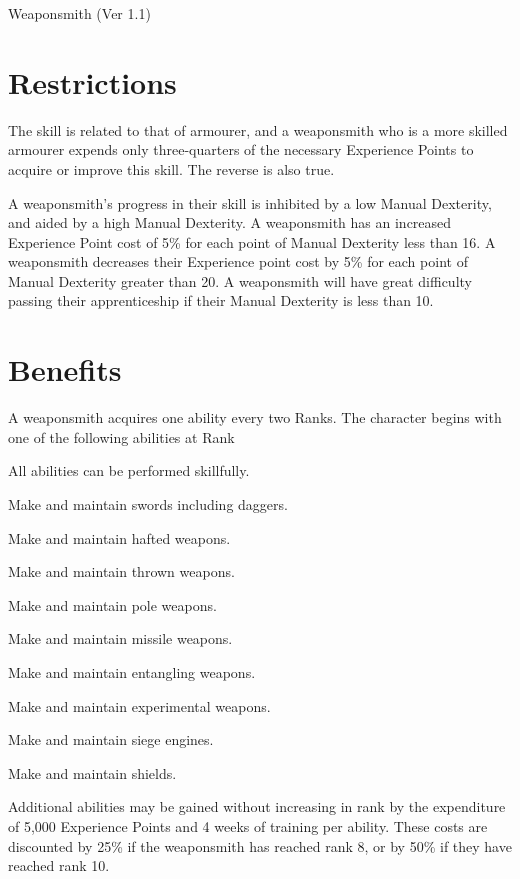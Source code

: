 \begin{Chapter}{Weaponsmith (Ver 1.1)}

\section{Restrictions}

The skill is related to that of armourer, and a weaponsmith who is a
more skilled armourer expends only three-quarters of the necessary
Experience Points to acquire or improve this skill.  The reverse is
also true.

A weaponsmith’s progress in their skill is inhibited by a low Manual
Dexterity, and aided by a high Manual Dexterity.  A weaponsmith has an
increased Experience Point cost of 5\% for each point of Manual
Dexterity less than 16.  A weaponsmith decreases their Experience
point cost by 5\% for each point of Manual Dexterity greater than
20. A weaponsmith will have great difficulty passing their
apprenticeship if their Manual Dexterity is less than 10.

\section{Benefits}

A weaponsmith acquires one ability every two Ranks.  The character
begins with one of the following abilities at Rank

\begin{Enumerate}\setcounter{enumi}{0}
\item   All abilities can be performed skillfully. 
\item   Make and maintain swords including daggers. 
\item   Make and maintain hafted weapons. 
\item   Make and maintain thrown weapons. 
\item   Make and maintain pole weapons. 
\item   Make and maintain missile weapons. 
\item   Make and maintain entangling weapons.
\item   Make and maintain experimental weapons. 
\item   Make and maintain siege engines. 
\item   Make and maintain shields. 
\end{Enumerate}

Additional abilities may be gained without increasing in rank by the
expenditure of 5,000 Experience Points and 4 weeks of training per
ability.  These costs are discounted by 25\% if the weaponsmith has
reached rank 8, or by 50\% if they have reached rank 10.


\end{Chapter}
